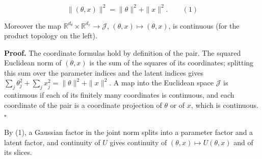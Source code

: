 \documentclass[11pt,a4paper]{report}
\begin{document}
\[\|(\theta,x)\|^2=\|\theta\|^2+\|x\|^2 .\qquad(1)\]


Moreover the map \(\mathbb R^{d_\theta}\times\mathbb R^{d_x}\to\mathcal J\), \((\theta,x)\mapsto(\theta,x)\), is continuous (for the product topology on the left).




\textbf{Proof.} The coordinate formulas hold by definition of the pair. The squared Euclidean norm of \((\theta,x)\) is the sum of the squares of its coordinates; splitting this sum over the parameter indices and the latent indices gives \(\sum_j\theta_j^2+\sum_jx_j^2=\|\theta\|^2+\|x\|^2\). A map into the Euclidean space \(\mathcal J\) is continuous if each of its finitely many coordinates is continuous, and each coordinate of the pair is a coordinate projection of \(\theta\) or of \(x\), which is continuous. \(\square\)




By (1), a Gaussian factor in the joint norm splits into a parameter factor and a latent factor, and continuity of \(U\) gives continuity of \((\theta,x)\mapsto U(\theta,x)\) and of its slices.
\end{document}
